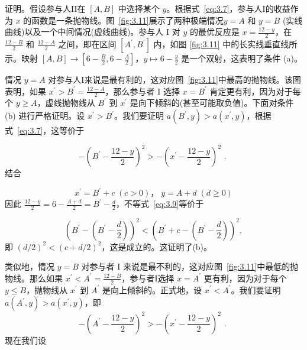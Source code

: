 证明。假设参与人II在 \(\left\lbrack  {A,B}\right\rbrack\) 中选择某个 \(y\)。根据式~\eqref{eq:3.7}，参与人I的收益作为 \(x\) 的函数是一条抛物线。图~\ref{fig:3.11}展示了两种极端情况\(y = A\) 和 \(y = B\) (实线曲线)以及一个中间情况(虚线曲线)。参与人 I 对 \(y\) 的最优反应是 \(x = \frac{{12} - y}{2}\)，在 \(\frac{{12} - B}{2}\) 和 \(\frac{{12} - A}{2}\) 之间，即在区间 \(\left\lbrack  {{A}^{\prime },{B}^{\prime }}\right\rbrack\) 内，如图 \ref{fig:3.11} 中的长实线垂直线所示。映射 \(\left\lbrack  {A,B}\right\rbrack   \rightarrow  \left\lbrack  {6 - \frac{B}{2},6 - \frac{A}{2}}\right\rbrack ，y \mapsto  6 - \frac{y}{2}\) 是一个双射，这表明了条件 (a)。

情况 \(y = A\) 对参与人I来说是最有利的，这对应图~\ref{fig:3.11}中最高的抛物线。该图表明，如果 \({x}^{\prime } > {B}^{\prime } = \frac{{12} - A}{2}\)，那么参与者 \(\mathrm{I}\) 选择 \(x = {B}^{\prime }\) 肯定更有利，因为对于每个 \(y \geq  A\)，虚线抛物线从 \({B}^{\prime }\) 到 \({x}^{\prime }\) 是向下倾斜的(甚至可能取负值)。下面对条件 (b) 进行严格证明。设 \({x}^{\prime } > {B}^{\prime }\)。我们要证明 \(a\left( {{B}^{\prime },y}\right)  > a\left( {{x}^{\prime },y}\right)\)，根据式~\eqref{eq:3.7}，这等价于

\begin{equation}\label{eq:3.9}
    -{\left( {B}^{\prime } - \frac{{12} - y}{2}\right) }^{2} >  - {\left( {x}^{\prime } - \frac{{12} - y}{2}\right) }^{2}\text{ . } 
\end{equation}
结合

\[
{x}^{\prime } = {B}^{\prime } + c\;\left( {c > 0}\right)，\;y = A + d\;\left( {d \geq  0}\right)
\]
因此 \(\frac{{12} - y}{2} = 6 - \frac{A + d}{2} = {B}^{\prime } - \frac{d}{2}\)，不等式~\eqref{eq:3.9}等价于

\[
{\left( {B}^{\prime } - \left( {B}^{\prime } - \frac{d}{2}\right) \right) }^{2} < {\left( {B}^{\prime } + c - \left( {B}^{\prime } - \frac{d}{2}\right) \right) }^{2},
\]
即 \({\left( d/2\right) }^{2} < {\left( c + d/2\right) }^{2}\)，这是成立的。这证明了(b)。

类似地，情况 \(y = B\) 对参与者 \(\mathrm{I}\) 来说是最不利的，这对应图~\ref{fig:3.11}中最低的抛物线。那么如果 \({x}^{\prime } < {A}^{\prime } = \frac{{12} - B}{2}\)，参与者I选择 \(x = {A}^{\prime }\) 更有利，因为对于每个 \(y \leq  B\)，抛物线从 \({x}^{\prime }\) 到 \({A}^{\prime }\) 是向上倾斜的。正式地，设 \({x}^{\prime } < {A}^{\prime }\)。我们要证明 \(a\left( {{A}^{\prime },y}\right)  > a\left( {{x}^{\prime },y}\right)\)，即
\begin{equation}\label{eq:3.10}
   - {\left( {A}^{\prime } - \frac{{12} - y}{2}\right) }^{2} >  - {\left( {x}^{\prime } - \frac{{12} - y}{2}\right) }^{2}\text{ . }  
\end{equation}
现在我们设

